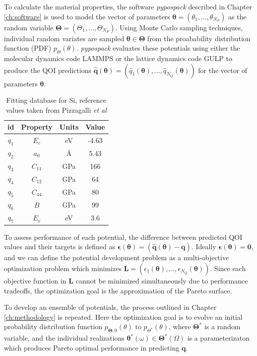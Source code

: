 To calculate the material properties, the software \emph{pypospack} described in Chapter \ref{ch:software} is used to model the vector of parameters $\bm{\theta} = (\theta_1,...,\theta_{N_P})$ as the random variable $\bm{\Theta} = (\Theta_1,...,\Theta_{N_P})$.
Using Monte Carlo sampling techniques, individual random variates are sampled $\bm{\theta} \in \bm{\Theta}$ from the proabability distribution function (PDF) $p_{\Theta}(\theta)$.
\emph{pypospack} evaluates these potentials using either the molecular dynamics code LAMMPS \cite{plimpton1995_lammps} or the lattice dynamics code GULP \cite{gale2003_gulp} to produce the QOI predictions
$\hat{\bm{q}}(\bm{\theta}) = (
    \hat{q}_1(\bm{\theta}),
    ...,
    \hat{q}_{N_Q}(\bm{\theta}))$ for the vector of parameters $\bm{\theta}$.

\begin{table}[htbp]
	\centering
	\caption{Fitting database for Si, reference values taken from Pizzagalli \emph{et al}\cite{pizzagalli2013_sw_Si}}
	\label{tbl:si_fitting_db}
	\begin{tabular}{c c c c}
		\hline
		id & Property & Units & Value \\
		\hline
		$q_1$ & $E_c$     & eV    & -4.63 \\
		$q_2$ & $a_0$     & \AA   &  5.43 \\
		$q_3$ & $C_{11}$ 	& GPa   & 166 \\
		$q_4$ & $C_{12}$  & GPa 	& 64 \\
		$q_5$ & $C_{44}$  & GPa   & 80 \\
		$q_6$ & $B$       & GPa   & 99 \\
		$q_7$ & $E_v$     & eV    & 3.6 \\
		\hline
	\end{tabular}
\end{table}

To assess performance of each potential, the difference between predicted QOI values and their targets is defined as $\bm{\epsilon}(\bm{\theta})=(\hat{\bm{q}}(\bm{\theta})-\bm{q})$.  Ideally  $\bm{\epsilon}(\bm{\theta}) = \bm{0}$, and we can define the potential development problem as a multi-objective optimization problem which minimizes $\bm{L} = (\epsilon_1(\bm{\theta}),...,\epsilon_{N_Q}(\bm{\theta}))$.
Since each objective function in $\bm{L}$ cannot be minimized simultaneously due to performance tradeoffs, the optimization goal is the approximation of the Pareto surface.

To develop an ensemble of potentials, the process outlined in Chapter \ref{ch:methodology} is repeated.  Here the optimization goal is to evolve an initial probability distribution function $p_{\bm{\Theta},0}(\theta)$ to $p_{\Theta^*}(\theta)$, where $\bm{\Theta}^*$ is a random variable, and the individual realizations $\bm{\theta}^*(\omega) \in \bm{\Theta}^*(\Omega)$ is a parameterizaton which produces Pareto optimal performance in predicting $\bm{q}$.

